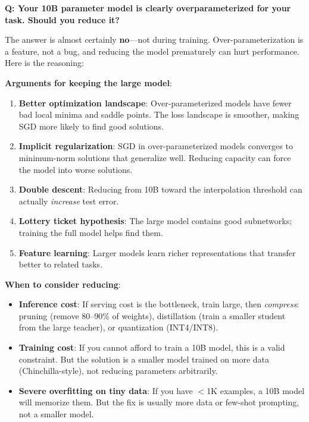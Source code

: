 \begin{interviewq}
\textbf{Q: Your 10B parameter model is clearly overparameterized for your task. Should you reduce it?}

 \quad {} \quad \badgefreq{\freqhigh}

\stronganswer
The answer is almost certainly \textbf{no}---not during training. Over-parameterization is a feature, not a bug, and reducing the model prematurely can hurt performance. Here is the reasoning:

\textbf{Arguments for keeping the large model}:
\begin{enumerate}
    \item \textbf{Better optimization landscape}: Over-parameterized models have fewer bad local minima and saddle points. The loss landscape is smoother, making SGD more likely to find good solutions.
    \item \textbf{Implicit regularization}: SGD in over-parameterized models converges to minimum-norm solutions that generalize well. Reducing capacity can force the model into worse solutions.
    \item \textbf{Double descent}: Reducing from 10B toward the interpolation threshold can actually \textit{increase} test error.
    \item \textbf{Lottery ticket hypothesis}: The large model contains good subnetworks; training the full model helps find them.
    \item \textbf{Feature learning}: Larger models learn richer representations that transfer better to related tasks.
\end{enumerate}

\textbf{When to consider reducing}:
\begin{itemize}
    \item \textbf{Inference cost}: If serving cost is the bottleneck, train large, then \textit{compress}: pruning (remove 80--90\% of weights), distillation (train a smaller student from the large teacher), or quantization (INT4/INT8).
    \item \textbf{Training cost}: If you cannot afford to train a 10B model, this is a valid constraint. But the solution is a smaller model trained on more data (Chinchilla-style), not reducing parameters arbitrarily.
    \item \textbf{Severe overfitting on tiny data}: If you have $<$1K examples, a 10B model will memorize them. But the fix is usually more data or few-shot prompting, not a smaller model.
\end{itemize}


\end{interviewq}
